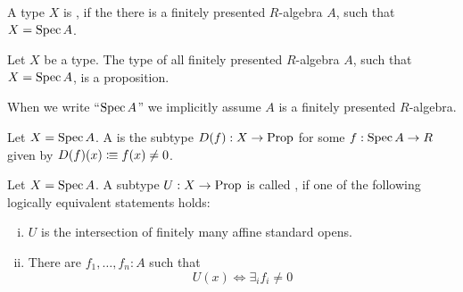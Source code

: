 
\begin{definition}%
  A type $X$ is ,
  if the there is a finitely presented $R$-algebra $A$, such that $X=\operatorname{Spec} A$. 
\end{definition}

\begin{proposition}%
  Let $X$ be a type.
  The type of all finitely presented $R$-algebra $A$, such that $X=\operatorname{Spec} A$, is a proposition.
\end{proposition}

When we write ``$\operatorname{Spec} A$'' we implicitly assume $A$ is a finitely presented $R$-algebra.

\begin{definition}%
  Let $X=\operatorname{Spec} A$.
  A  is the subtype $D(f):X\to\mathrm{Prop}$
  for some $f:\operatorname{Spec} A\to R$ given by $D(f)(x)\vcentcolon\mspace{-1.2mu}\equiv f(x)\neq 0$.
\end{definition}

\begin{definition}%
  \label{def:affine-open}
  Let $X=\operatorname{Spec} A$.
  A subtype $U:X\to\mathrm{Prop}$ is called ,
  if one of the following logically equivalent statements holds:
  \begin{enumerate}[(i)]%
  \item $U$ is the intersection of finitely many affine standard opens.
  \item There are $f_1,\dots,f_n:A$ such that
    \[U(x) \Leftrightarrow \exists_{i}f_i\neq 0 \]
  \end{enumerate}
\end{definition}